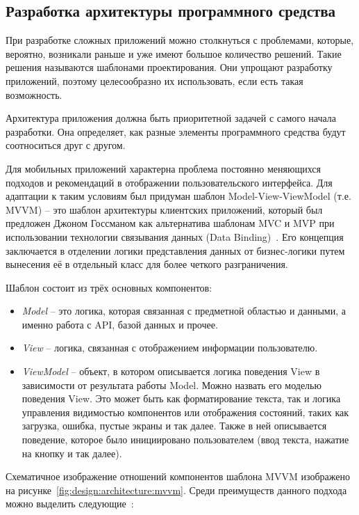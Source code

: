 \subsection{Разработка архитектуры программного средства}
\label{sec:design:architecture}

При разработке сложных приложений можно столкнуться с проблемами, которые, вероятно, возникали раньше и уже имеют большое количество решений.
Такие решения называются шаблонами проектирования.
Они упрощают разработку приложений, поэтому целесообразно их использовать, если есть такая возможность.

Архитектура приложения должна быть приоритетной задачей с самого начала разработки.
Она определяет, как разные элементы программного средства будут соотноситься друг с другом.

Для мобильных приложений характерна проблема постоянно меняющихся подходов и рекомендаций в отображении пользовательского интерфейса.
Для адаптации к таким условиям был придуман шаблон Model-View-ViewModel (т.е. MVVM) -- это шаблон архитектуры клиентских приложений, который был предложен Джоном Госсманом как альтернатива шаблонам MVC и MVP при использовании технологии связывания данных (Data Binding)~\cite{microsoft_mvvm}.
Его концепция заключается в отделении логики представления данных от бизнес-логики путем вынесения её в отдельный класс для более четкого разграничения.

Шаблон состоит из трёх основных компонентов:
\begin{itemize}
    \item \emph{Model} -- это логика, которая связанная с предметной областью и данными, а именно работа с API, базой данных и прочее.
    \item \emph{View} -- логика, связанная с отображением информации пользователю.
    \item \emph{ViewModel} -- объект, в котором описывается логика поведения View в зависимости от результата работы Model.
    Можно назвать его моделью поведения View.
    Это может быть как форматирование текста, так и логика управления видимостью компонентов или отображения состояний, таких как загрузка, ошибка, пустые экраны и так далее.
    Также в ней описывается поведение, которое было инициировано пользователем (ввод текста, нажатие на кнопку и так далее).
\end{itemize}

Схематичное изображение отношений компонентов шаблона MVVM изображено на рисунке~\ref{fig:design:architecture:mvvm}.
Среди преимуществ данного подхода можно выделить следующие~\cite{android_mvvm}:

